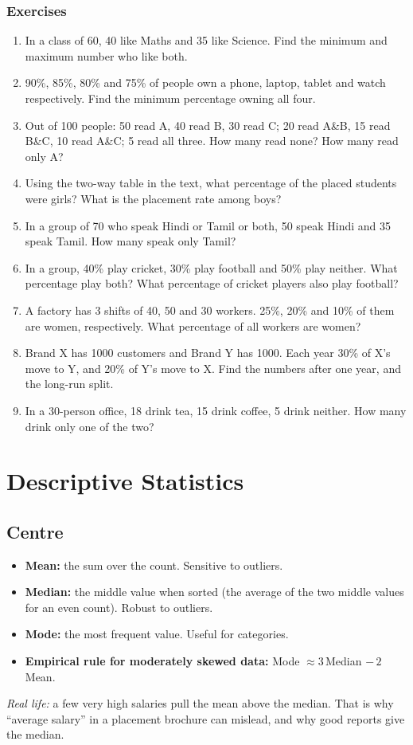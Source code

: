 \documentclass[11pt,a4paper,openany]{report}
\newenvironment{exercises}{\subsection*{Exercises \thechapter}\begin{enumerate}[label=\textbf{\thechapter.\arabic*},leftmargin=3.2em]}{\end{enumerate}}
\begin{document}
\begin{exercises}
\item In a class of 60, 40 like Maths and 35 like Science. Find the minimum and maximum number who like both.
\item 90\%, 85\%, 80\% and 75\% of people own a phone, laptop, tablet and watch respectively. Find the minimum percentage owning all four.
\item Out of 100 people: 50 read A, 40 read B, 30 read C; 20 read A\&B, 15 read B\&C, 10 read A\&C; 5 read all three. How many read none? How many read only A?
\item Using the two-way table in the text, what percentage of the placed students were girls? What is the placement rate among boys?
\item In a group of 70 who speak Hindi or Tamil or both, 50 speak Hindi and 35 speak Tamil. How many speak only Tamil?
\item In a group, 40\% play cricket, 30\% play football and 50\% play neither. What percentage play both? What percentage of cricket players also play football?
\item A factory has 3 shifts of 40, 50 and 30 workers. 25\%, 20\% and 10\% of them are women, respectively. What percentage of all workers are women?
\item Brand X has 1000 customers and Brand Y has 1000. Each year 30\% of X's move to Y, and 20\% of Y's move to X. Find the numbers after one year, and the long-run split.
\item In a 30-person office, 18 drink tea, 15 drink coffee, 5 drink neither. How many drink only one of the two?
\end{exercises}

\chapter{Descriptive Statistics}\label{ch:stats}

\section{Centre}
\begin{itemize}[nosep]
\item \textbf{Mean:} the sum over the count. Sensitive to outliers.
\item \textbf{Median:} the middle value when sorted (the average of the two middle values for an even count). Robust to outliers.
\item \textbf{Mode:} the most frequent value. Useful for categories.
\item \textbf{Empirical rule for moderately skewed data:} Mode $\approx3\,$Median $-\,2\,$Mean.
\end{itemize}
\textit{Real life:} a few very high salaries pull the mean above the median. That is why ``average salary'' in a placement brochure can mislead, and why good reports give the median.
\end{document}
